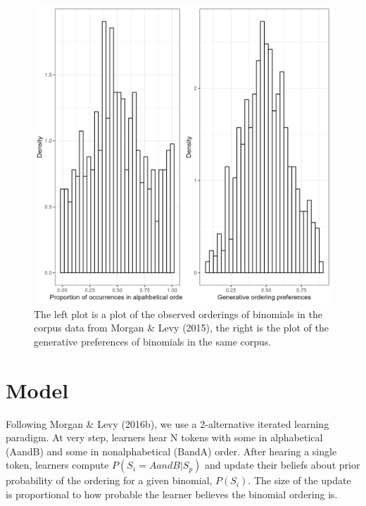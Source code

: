 \documentclass[10pt, letterpaper]{article}
\newenvironment{CodeChunk}{}{}
\begin{document}
\begin{CodeChunk}
\begin{figure}[tb]

{\centering \includegraphics[width=1\linewidth,height=0.15\textheight]{Figures/corpus_plots} 

}

\caption[The left plot is a plot of the observed orderings of binomials in the corpus data from Morgan \& Levy (2015), the right is the plot of the generative preferences of binomials in the same corpus]{The left plot is a plot of the observed orderings of binomials in the corpus data from Morgan \& Levy (2015), the right is the plot of the generative preferences of binomials in the same corpus.}\label{fig:corpusplot1}
\end{figure}
\end{CodeChunk}

\hypertarget{model}{%
\section{Model}\label{model}}

Following Morgan \& Levy (2016b), we use a 2-alternative iterated
learning paradigm. At very step, learners hear N tokens with some in
alphabetical (AandB) and some in nonalphabetical (BandA) order. After
hearing a single token, learners compute \(P(S_i = AandB|S_p)\) and
update their beliefs about prior probability of the ordering for a given
binomial, \(P(S_i)\). The size of the update is proportional to how
probable the learner believes the binomial ordering is.
\end{document}
